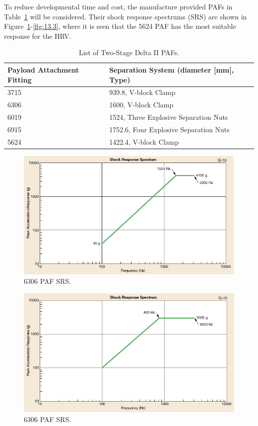 \documentclass[paper=letter, fontsize=11pt]{scrartcl} %
\numberwithin{equation}{section} %
\numberwithin{figure}{section} %
\numberwithin{table}{section} %
\begin{document}
To reduce developmental time and cost, the manufacture provided PAFs in Table~\ref{13.1} will be considered. Their shock response spectrums (SRS) are shown in Figure~\ref{fig:13.1}-\ref{fig:13.3}, where it is seen that the 5624 PAF has the most suitable response for the HRV.

\begin{table}[H]
    \centering
    \begin{tabular}{l l}
        \toprule
        Payload Attachment Fitting & Separation System (diameter [mm], Type) \\
        \midrule
        3715                       & 939.8, V-block Clamp                    \\
        6306                       & 1600, V-block Clamp                     \\
        6019                       & 1524, Three Explosive Separation Nuts   \\
        6915                       & 1752.6, Four Explosive Separation Nuts  \\
        5624                       & 1422.4, V-block Clamp                   \\
        \bottomrule
    \end{tabular}
    \caption{List of Two-Stage Delta II PAFs.}
    \label{13.1}
\end{table}

\begin{figure}[H]
    \begin{center}
        \includegraphics[width=.75\textwidth]{SS13_Shock_PAF/13-1.png}
        \caption{6306 PAF SRS.}
        \label{fig:13.1}
    \end{center}
\end{figure}

\begin{figure}[H]
    \begin{center}
        \includegraphics[width=.55\textwidth]{SS13_Shock_PAF/13-2.png}
        \caption{6306 PAF SRS.}
        \label{fig:13.2}
    \end{center}
\end{figure}
\end{document}
